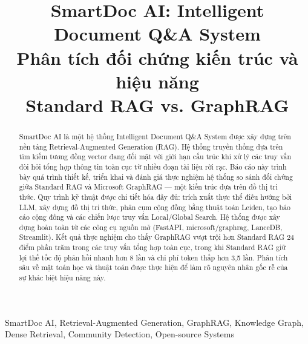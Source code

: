 \documentclass[10pt, conference, a4paper]{IEEEtran}
\begin{document}
\fontsize{10}{12}
\selectfont


\title{\huge SmartDoc AI: Intelligent Document Q\&A System \\
\large{Phân tích đối chứng kiến trúc và hiệu năng \\ Standard RAG vs. GraphRAG}}

\author{
}

\maketitle

\begin{abstract}
SmartDoc AI là một hệ thống Intelligent Document Q\&A System được xây dựng trên nền tảng Retrieval-Augmented Generation (RAG). Hệ thống truyền thống dựa trên tìm kiếm tương đồng vector đang đối mặt với giới hạn cấu trúc khi xử lý các truy vấn đòi hỏi tổng hợp thông tin toàn cục từ nhiều đoạn tài liệu rời rạc. Báo cáo này trình bày quá trình thiết kế, triển khai và đánh giá thực nghiệm hệ thống so sánh đối chứng giữa Standard RAG và Microsoft GraphRAG — một kiến trúc dựa trên đồ thị tri thức. Quy trình kỹ thuật được chi tiết hóa đầy đủ: trích xuất thực thể điều hướng bởi LLM, xây dựng đồ thị tri thức, phân cụm cộng đồng bằng thuật toán Leiden, tạo báo cáo cộng đồng và các chiến lược truy vấn Local/Global Search. Hệ thống được xây dựng hoàn toàn từ các công cụ nguồn mở (FastAPI, microsoft/graphrag, LanceDB, Streamlit). Kết quả thực nghiệm cho thấy GraphRAG vượt trội hơn Standard RAG 24 điểm phần trăm trong các truy vấn tổng hợp toàn cục, trong khi Standard RAG giữ lợi thế tốc độ phản hồi nhanh hơn 8 lần và chi phí token thấp hơn 3,5 lần. Phân tích sâu về mặt toán học và thuật toán được thực hiện để làm rõ nguyên nhân gốc rễ của sự khác biệt hiệu năng này.
\end{abstract}

\begin{IEEEkeywords}
SmartDoc AI, Retrieval-Augmented Generation, GraphRAG, Knowledge Graph, Dense Retrieval, Community Detection, Open-source Systems
\end{IEEEkeywords}
\end{document}
